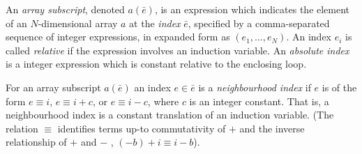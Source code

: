 \begin{defn}\label{def:array-subs}
  An \emph{array subscript}, denoted $a(\bar{e})$, is an expression
  which indicates the element of an $N$-dimensional array $a$ at the
  \emph{index} $\bar{e}$, specified by a comma-separated sequence of
  integer expressions, in expanded form as $(e_1, \ldots, e_N)$. An
  index $e_i$ is called \emph{relative} if the expression involves an
  induction variable. An \emph{absolute index} is a integer expression
  which is constant relative to the enclosing loop.
\end{defn}

\begin{defn}\label{def:neighbour-ix}
  For an array subscript $a(\bar{e})$ an index $e \in \bar{e}$ is a
  \emph{neighbourhood index} if $e$ is of the form $e \equiv i$, $e \equiv i +
  c$, or $e \equiv i - c$, where $c$ is an integer constant. That is, a
  neighbourhood index is a constant translation of an induction variable. (The
  relation $\equiv$ identifies terms up-to commutativity of $+$ and the inverse
  relationship of $+$ and $-$ \eg{}, $(-b) + i \equiv i - b$).
\end{defn}



